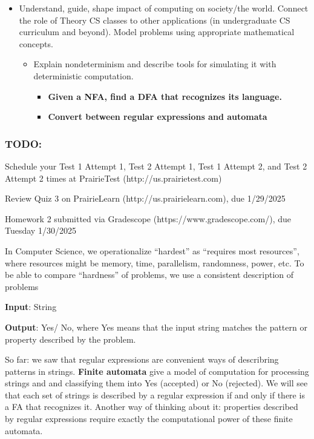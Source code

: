 \begin{itemize}
\item Understand, guide, shape impact of computing on society/the world. Connect the role of Theory CS classes to other applications (in undergraduate CS curriculum and beyond). Model problems using appropriate mathematical concepts.
 \begin{itemize}
     \item Explain nondeterminism and describe tools for simulating it with deterministic computation.
     \begin{itemize}
       \item {\bf Given a NFA, find a DFA that recognizes its language.}
       \item {\bf Convert between regular expressions and automata}
     \end{itemize}
 \end{itemize}

\end{itemize}

\vspace{-20pt}

\subsubsection*{TODO:}
\begin{list}{\itemsep-10pt}
   \item Schedule your Test 1 Attempt 1, Test 2 Attempt 1, Test 1 Attempt 2, and Test 2 Attempt 2 times 
   at PrairieTest (http://us.prairietest.com)
   \item Review Quiz 3 on PrairieLearn (http://us.prairielearn.com), due 1/29/2025
   \item Homework 2 submitted via Gradescope (https://www.gradescope.com/), due Tuesday 1/30/2025
\end{list}


\vfill

In Computer Science, we operationalize ``hardest'' as ``requires most resources'', where
resources might be memory, time, parallelism, randomness, power, etc.
To be able to compare ``hardness'' of problems, we use a consistent description of problems

{\bf Input}: String

{\bf Output}: Yes/ No, where Yes means that the input string matches the pattern or property described by the problem.

So far: we saw that regular expressions are convenient ways of describring patterns in strings.
{\bf Finite automata} give a model of computation for processing strings and and classifying them into Yes (accepted)
or No (rejected). We will see that each set of strings is described by a regular expression if and only 
if there is a FA that recognizes it.  Another way of thinking about it: properties described by regular
expressions require exactly the computational power of these finite automata.

